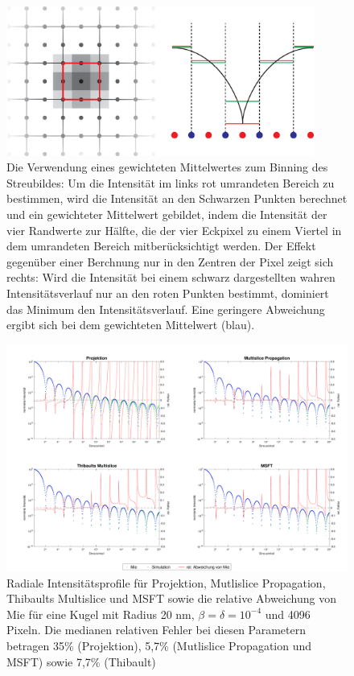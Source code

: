 \begin{figure}
	\centering
	\includegraphics[width=0.9\textwidth]{images/average.eps}
	\caption[Gewichteter Mittelwert]{Die Verwendung eines gewichteten Mittelwertes zum Binning des Streubildes: Um die Intensität im links rot umrandeten Bereich zu bestimmen, wird die Intensität an den Schwarzen Punkten berechnet und ein gewichteter Mittelwert gebildet, indem die Intensität der vier Randwerte zur Hälfte, die der vier Eckpixel zu einem Viertel in dem umrandeten Bereich mitberücksichtigt werden. Der Effekt gegenüber einer Berchnung nur in den Zentren der Pixel zeigt sich rechts: Wird die Intensität bei einem schwarz dargestellten wahren Intensitätsverlauf nur an den roten Punkten bestimmt, dominiert das Minimum den Intensitätsverlauf. Eine geringere Abweichung ergibt sich bei dem gewichteten Mittelwert (blau).}
	\label{fig:average}
\end{figure} 

\begin{figure}
		\centering
		\includegraphics[width=1\textwidth]{images/fig_sim_profile.pdf}
		\caption[Radiale Profile]{Radiale Intensitätsprofile für Projektion, Mutlislice Propagation, Thibaults Multislice und MSFT sowie die relative Abweichung von Mie für eine Kugel mit Radius 20 \si{nm}, $\beta=\delta=10^{-4}$ und 4096 Pixeln. Die medianen relativen Fehler bei diesen Parametern betragen 35\% (Projektion), 5,7\% (Mutlislice Propagation und MSFT) sowie 7,7\% (Thibault)}
		\label{fig:profil}
\end{figure}


